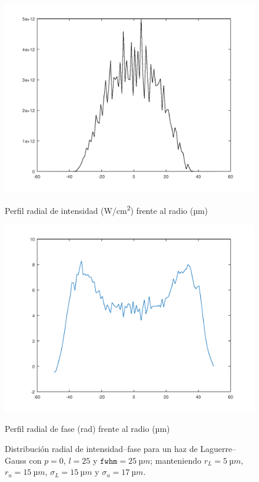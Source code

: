 \begin{figure}[htbp]
  \centering
  \begin{subcaptionblock}{.4\textwidth}
    \centering
    \includegraphics[width=\textwidth]{Figuras/ch4_oam1.png}
    \caption{Perfil radial de intensidad (\unit{W/cm^2}) frente al radio (\unit{µm})}\label{fig:ch4_oam1}
  \end{subcaptionblock}
  \begin{subcaptionblock}{.4\textwidth}
    \centering
    \includegraphics[width=\textwidth]{Figuras/ch4_oam2.png}
    \caption{Perfil radial de fase (\unit{rad}) frente al radio (\unit{µm})}\label{fig:ch4_oam2}
  \end{subcaptionblock}
   \caption{Distribución radial de intensidad--fase para un haz de Laguerre--Gauss con $p=0$, $l=25$ y $\texttt{fwhm}=\qty{25}{µm}$; manteniendo $r_{L}=\qty{5}{µm}$, $r_{u}=\qty{15}{µm}$, $\sigma_{L}=\qty{15}{µm}$ y $\sigma_{u}=\qty{17}{µm}$.}
   \label{fig:4.34}
\end{figure}

